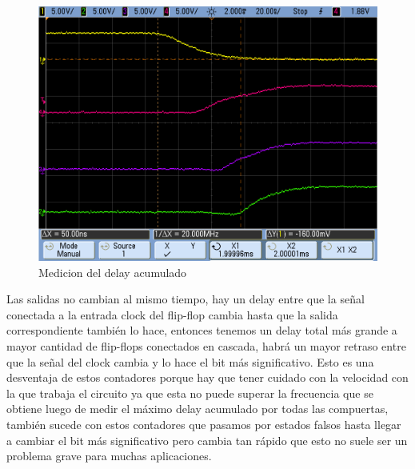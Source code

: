 \begin{figure}
\begin{center}
\includegraphics[scale=0.25]{ejercicio7/imagenes/timepropagation.png}
\caption{Medicion del delay acumulado}\label{7_fig3}
\end{center}
\end{figure}

Las salidas no cambian al mismo tiempo, hay un delay entre que la señal conectada a la entrada clock del flip-flop cambia hasta que la salida correspondiente también lo hace, entonces tenemos un delay total m\'as grande a mayor cantidad de flip-flops conectados en cascada, habr\'a un mayor retraso entre que la señal del clock cambia y lo hace el bit m\'as significativo. Esto es una desventaja de estos contadores porque hay que tener cuidado con la velocidad con la que trabaja el circuito ya que esta no puede superar la frecuencia que se obtiene luego de medir el m\'aximo delay acumulado por todas las compuertas, también sucede con estos contadores que pasamos por estados falsos hasta llegar a cambiar el bit m\'as significativo pero cambia tan r\'apido que esto no suele ser un problema grave para muchas aplicaciones.

